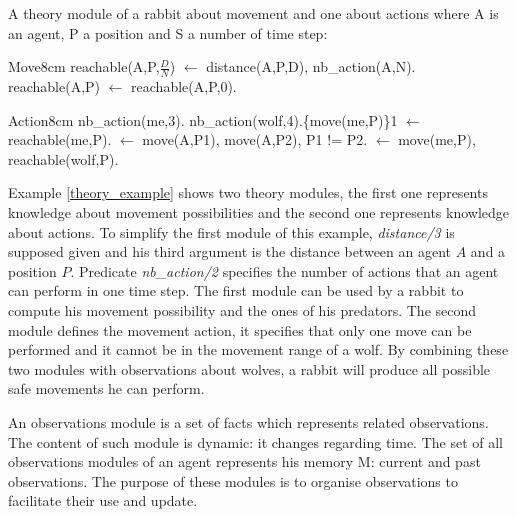\documentclass{aamas2012}
\begin{document}
	\begin{example}
		\label{theory_example}
		
		A theory module of a rabbit about movement and one about actions where A is an agent, P a position and S a number of time step:\newline
		\begin{module}{Move}{8cm}
			reachable(A,P,$\frac{D}{N}$) $\leftarrow$ distance(A,P,D), nb\_action(A,N).\newline
			reachable(A,P) $\leftarrow$ reachable(A,P,0).
		\end{module}
		
		\begin{module}{Action}{8cm}
			nb\_action(me,3).\newline
			nb\_action(wolf,4).\{move(me,P)\}1 $\leftarrow$ reachable(me,P).\newline
			$\leftarrow$ move(A,P1), move(A,P2), P1 != P2.\newline
			$\leftarrow$ move(me,P), reachable(wolf,P).
		\end{module}
		
	\end{example}
	
	Example \ref{theory_example} shows two theory modules, the first one represents knowledge about movement possibilities
	and the second one represents knowledge about actions.
	To simplify the first module of this example, \emph{distance/3} is supposed given and 
	his third argument is the distance between an agent $A$ and a position $P$.
	Predicate \emph{nb\_action/2} specifies the number of actions that an agent can perform in one time step.
	The first module can be used by a rabbit to compute his movement possibility and the ones of his predators.
	The second module defines the movement action, it specifies that only one move can be performed and it cannot be in the movement range of a wolf.
	By combining these two modules with observations about wolves, a rabbit will produce all possible safe movements he can perform.

	\begin{definition}
		An observations module is a set of facts which represents related observations.
		The content of such module is dynamic: it changes regarding time.
		The set of all observations modules of an agent represents his memory M: current and past observations.
		The purpose of these modules is to organise observations to facilitate their use and update.
	\end{definition}
	
\end{document}
